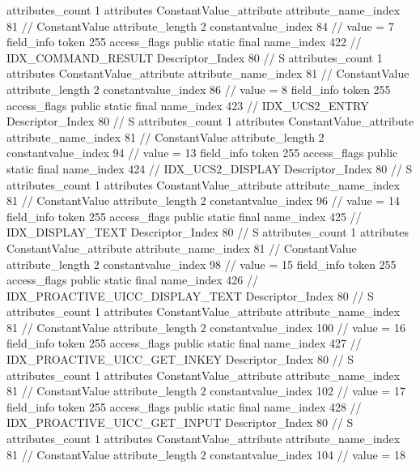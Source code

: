 {{{{{				attributes_count	1
				attributes {
				ConstantValue_attribute {
					attribute_name_index	81		// ConstantValue
					attribute_length	2
					constantvalue_index	84		// value = 7
				}
				}
			}
			field_info {
				token	255
				access_flags	public static final
				name_index	422		// IDX_COMMAND_RESULT
				Descriptor_Index	80		// S
				attributes_count	1
				attributes {
				ConstantValue_attribute {
					attribute_name_index	81		// ConstantValue
					attribute_length	2
					constantvalue_index	86		// value = 8
				}
				}
			}
			field_info {
				token	255
				access_flags	public static final
				name_index	423		// IDX_UCS2_ENTRY
				Descriptor_Index	80		// S
				attributes_count	1
				attributes {
				ConstantValue_attribute {
					attribute_name_index	81		// ConstantValue
					attribute_length	2
					constantvalue_index	94		// value = 13
				}
				}
			}
			field_info {
				token	255
				access_flags	public static final
				name_index	424		// IDX_UCS2_DISPLAY
				Descriptor_Index	80		// S
				attributes_count	1
				attributes {
				ConstantValue_attribute {
					attribute_name_index	81		// ConstantValue
					attribute_length	2
					constantvalue_index	96		// value = 14
				}
				}
			}
			field_info {
				token	255
				access_flags	public static final
				name_index	425		// IDX_DISPLAY_TEXT
				Descriptor_Index	80		// S
				attributes_count	1
				attributes {
				ConstantValue_attribute {
					attribute_name_index	81		// ConstantValue
					attribute_length	2
					constantvalue_index	98		// value = 15
				}
				}
			}
			field_info {
				token	255
				access_flags	public static final
				name_index	426		// IDX_PROACTIVE_UICC_DISPLAY_TEXT
				Descriptor_Index	80		// S
				attributes_count	1
				attributes {
				ConstantValue_attribute {
					attribute_name_index	81		// ConstantValue
					attribute_length	2
					constantvalue_index	100		// value = 16
				}
				}
			}
			field_info {
				token	255
				access_flags	public static final
				name_index	427		// IDX_PROACTIVE_UICC_GET_INKEY
				Descriptor_Index	80		// S
				attributes_count	1
				attributes {
				ConstantValue_attribute {
					attribute_name_index	81		// ConstantValue
					attribute_length	2
					constantvalue_index	102		// value = 17
				}
				}
			}
			field_info {
				token	255
				access_flags	public static final
				name_index	428		// IDX_PROACTIVE_UICC_GET_INPUT
				Descriptor_Index	80		// S
				attributes_count	1
				attributes {
				ConstantValue_attribute {
					attribute_name_index	81		// ConstantValue
					attribute_length	2
					constantvalue_index	104		// value = 18
				}
				}
}}}}}
